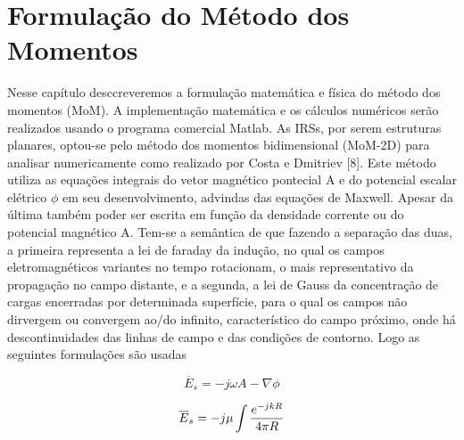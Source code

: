 




\chapter{Formulação do Método dos Momentos}\label{cap_exemplos}

Nesse capítulo desccreveremos a formulação matemática e física do método dos momentos (MoM). A implementação matemática e os cálculos numéricos serão realizados usando o programa comercial Matlab. As IRSs, por serem estruturas planares, optou-se pelo método dos momentos bidimensional (MoM-2D) para analisar numericamente como realizado por Costa e Dmitriev [8]. Este método utiliza as equações integrais do vetor magnético pontecial A e do potencial escalar elétrico $\phi$ em seu desenvolvimento, advindas das equações de Maxwell. Apesar da última também poder ser escrita em função da densidade corrente ou do potencial magnético A. Tem-se a semântica de que fazendo a separação das duas, a primeira representa a lei de faraday da indução, no qual os campos eletromagnéticos variantes no tempo rotacionam, o mais representativo da propagação no campo distante, e a segunda, a lei de Gauss da concentração de cargas encerradas por determinada superfície, para o qual os campos não dirvergem ou convergem ao/do infinito, característico do campo próximo, onde há descontinuidades das linhas de campo e das condições de contorno. Logo as seguintes formulações são usadas

\begin{equation}
  \overline{E}_{s}=-j\omega A - \nabla \phi
\end{equation}

\begin{equation}
  \overline{E}_{s}=-j\mu \intop \frac{e^{-j k R}}{4 \pi R}
  \end{equation}
